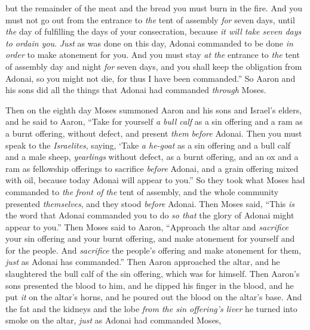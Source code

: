 \begin{biblechapter}
\verse but the remainder of the meat and the bread you must burn in the fire.
\verse And you must not go out from the entrance to \textit{the} tent of assembly \textit{for} seven days, until \textit{the} day of fulfilling the days of your consecration, because \textit{it will take seven days to ordain you}.
\verse \textit{Just} as was done on this day, Adonai commanded to be done \textit{in order} to make atonement for you.
\verse And you must stay \textit{at the} entrance to \textit{the} tent of assembly day and night \textit{for} seven days, and you shall keep the obligation from Adonai, so you might not die, for thus I have been commanded.”
\verse So Aaron and his sons did all the things that Adonai had commanded \textit{through} Moses.
\end{biblechapter}

\begin{biblechapter} %
 Then on the eighth day Moses summoned Aaron and his sons and Israel’s elders,
\verse and he said to Aaron, “Take for yourself \textit{a bull calf} as a sin offering and a ram as a burnt offering, without defect, and present \textit{them} \textit{before} Adonai.
\verse Then you must speak to the \textit{Israelites}, saying, ‘Take \textit{a he-goat} as a sin offering and a bull calf and a male sheep, \textit{yearlings} without defect, as a burnt offering,
\verse and an ox and a ram as fellowship offerings to sacrifice \textit{before} Adonai, and a grain offering mixed with oil, because today Adonai will appear to you.”
\verse So they took what Moses had commanded to \textit{the} \textit{front of} \textit{the} tent of assembly, and the whole community presented \textit{themselves}, and they stood \textit{before} Adonai.
\verse Then Moses said, “This \textit{is} the word that Adonai commanded you to do \textit{so that} the glory of Adonai might appear to you.”
\verse Then Moses said to Aaron, “Approach the altar and \textit{sacrifice} your sin offering and your burnt offering, and make atonement for yourself and for the people. And \textit{sacrifice} the people’s offering and make atonement for them, \textit{just} as Adonai has commanded.”
\verse Then Aaron approached the altar, and he slaughtered the bull calf of the sin offering, which was for himself.
\verse Then Aaron’s sons presented the blood to him, and he dipped his finger in the blood, and he put \textit{it} on the altar’s horns, and he poured out the blood on the altar’s base.
\verse And the fat and the kidneys and the lobe \textit{from the sin offering’s liver} he turned into smoke on the altar, \textit{just} as Adonai had commanded Moses,

\end{biblechapter}
